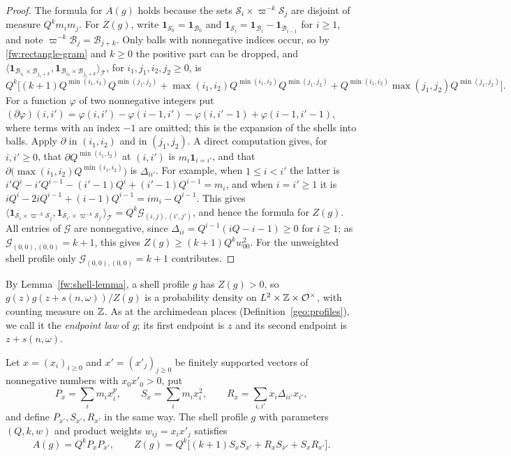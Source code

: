 \begin{proof}
The formula for $A(g)$ holds because the sets
$\mathcal S_i\times\varpi^{-k}\mathcal S_j$ are disjoint of measure
$Q^km_im_j$. For $Z(g)$, write $\mathbf 1_{\mathcal S_0}=\mathbf
1_{\mathcal B_0}$ and $\mathbf 1_{\mathcal S_i}=\mathbf 1_{\mathcal
B_i}-\mathbf 1_{\mathcal B_{i-1}}$ for $i\ge1$, and note
$\varpi^{-k}\mathcal B_j=\mathcal B_{j+k}$. Only balls with nonnegative
indices occur, so by \eqref{fw:rectangle-gram} and $k\ge0$ the positive
part can be dropped, and
$\langle\mathbf 1_{\mathcal B_{i_1}\times\mathcal B_{j_1+k}},
\mathbf 1_{\mathcal B_{i_2}\times\mathcal B_{j_2+k}}\rangle_{\mathcal T}$,
for $i_1,j_1,i_2,j_2\ge0$, is
\[
 Q^k\bigl[(k+1)Q^{\min(i_1,i_2)}Q^{\min(j_1,j_2)}
 +\max(i_1,i_2)Q^{\min(i_1,i_2)}Q^{\min(j_1,j_2)}
 +Q^{\min(i_1,i_2)}\max(j_1,j_2)Q^{\min(j_1,j_2)}\bigr].
\]
For a function $\varphi$ of two nonnegative integers put
$(\partial\varphi)(i,i')=\varphi(i,i')-\varphi(i-1,i')-\varphi(i,i'-1)
+\varphi(i-1,i'-1)$, where terms with an index $-1$ are omitted; this is
the expansion of the shells into balls. Apply $\partial$ in
$(i_1,i_2)$ and in $(j_1,j_2)$. A direct computation gives, for
$i,i'\ge0$, that $\partial Q^{\min(i_1,i_2)}$ at $(i,i')$ is
$m_i\mathbf 1_{i=i'}$, and that
$\partial\bigl(\max(i_1,i_2)Q^{\min(i_1,i_2)}\bigr)$ is $\Delta_{ii'}$.
For example, when $1\le i<i'$ the latter is
$i'Q^i-i'Q^{i-1}-(i'-1)Q^i+(i'-1)Q^{i-1}=m_i$, and when $i=i'\ge1$ it is
$iQ^i-2iQ^{i-1}+(i-1)Q^{i-1}=im_i-Q^{i-1}$. This gives
$\langle\mathbf 1_{\mathcal S_i\times\varpi^{-k}\mathcal S_j},
\mathbf 1_{\mathcal S_{i'}\times\varpi^{-k}\mathcal S_{j'}}\rangle_{\mathcal T}
=Q^k\mathcal G_{(i,j),(i',j')}$, and hence the formula for $Z(g)$.
All entries of $\mathcal G$ are nonnegative, since
$\Delta_{ii}=Q^{i-1}(iQ-i-1)\ge0$ for $i\ge1$; as
$\mathcal G_{(0,0),(0,0)}=k+1$, this gives $Z(g)\ge(k+1)Q^kw_{00}^2$.
For the unweighted shell profile only $\mathcal G_{(0,0),(0,0)}=k+1$
contributes.
\end{proof}

By Lemma~\ref{fw:shell-lemma}, a shell profile $g$ has $Z(g)>0$, so
$g(z)g(z+s(n,\omega))/Z(g)$ is a probability density on
$L^2\times\mathbb Z\times\mathcal O^\times$, with counting measure on $\mathbb Z$. As
at the archimedean places (Definition~\ref{geo:profiles}), we call it
the \emph{endpoint law} of $g$; its first endpoint is $z$ and its second
endpoint is $z+s(n,\omega)$.

\begin{corollary}\label{fw:product-weights}
Let $x=(x_i)_{i\ge0}$ and $x'=(x'_j)_{j\ge0}$ be finitely supported
vectors of nonnegative numbers with $x_0x'_0>0$, put
\[
 P_x=\sum_im_ix_i^p,\qquad S_x=\sum_im_ix_i^2,\qquad
 R_x=\sum_{i,i'}x_i\Delta_{ii'}x_{i'},
\]
and define $P_{x'},S_{x'},R_{x'}$ in the same way. The shell profile
$g$ with parameters $(Q,k,w)$ and product weights $w_{ij}=x_ix'_j$
satisfies
\begin{equation}\label{fw:product-shells}
 A(g)=Q^kP_xP_{x'},\qquad
 Z(g)=Q^k\bigl[(k+1)S_xS_{x'}+R_xS_{x'}+S_xR_{x'}\bigr].
\end{equation}
\end{corollary}

